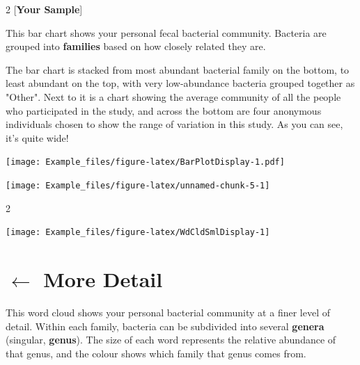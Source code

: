 \documentclass[
]{article}
\begin{document}
\newpage

\vspace*{\fill}

\begin{multicols}{2}
[\textbf{Your Sample}]

\begin{small}
This bar chart shows your personal fecal bacterial community. 
Bacteria are grouped into \textbf{families} based on how closely related
they are.

The bar chart is stacked from most abundant bacterial family on the 
bottom, to least abundant on the top, with very low-abundance 
bacteria grouped together as "Other". Next to it is a chart showing
the average community of all the people who participated in the study,
and across the bottom are four anonymous individuals chosen to show
the range of variation in this study. As you can see, it's quite wide!
\end{small}
\columnbreak

\texttt{[image: Example\_files/figure-latex/BarPlotDisplay-1.pdf]}

\end{multicols}

\begin{center}\texttt{[image: Example\_files/figure-latex/unnamed-chunk-5-1]} \end{center}
\vspace*{\fill}
\newpage

\begin{multicols}{2}
\raggedcolumns

\begin{center}\texttt{[image: Example\_files/figure-latex/WdCldSmlDisplay-1]} \end{center}

\columnbreak

\vspace*{1cm}
\section{$\boldsymbol{\leftarrow}$ More Detail}
\begin{small}
This word cloud shows your personal bacterial community at a finer 
level of detail. Within each family, bacteria can be subdivided into 
several \textbf{genera} (singular, \textbf{genus}). The size of each word
represents the relative abundance of that genus, and the colour shows
which family that genus comes from.
\end{small}
\vspace*{\fill}

\end{multicols}
\end{document}

